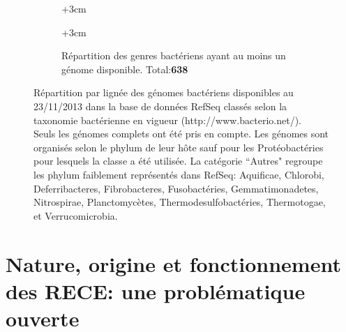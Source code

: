 \begin{figure}[H]
\begin{subfigure}{1\textwidth}
\begin{tikzpicture}
      	\end{tikzpicture}
     {\advance\leftskip+3cm}
    	\end{subfigure}
	\begin{subfigure}{1\textwidth}\label{fig2}
	\hspace{-3cm}
      {\advance\leftskip+3cm\caption{Répartition des genres bactériens ayant au moins un génome disponible. Total:\textbf{638}}}
      \end{subfigure}
      \hspace*{-3cm}
      \begin{minipage}{1.37\textwidth}
      \medskip
      \caption[Répartition par lignée des génomes bactériens disponibles]{\scriptsize Répartition par lignée des génomes bactériens disponibles au 23/11/2013 dans la base de données RefSeq \citep{pruitt2007ncbi} classés selon la taxonomie bactérienne en vigueur (http://www.bacterio.net/).\\
       Seuls les génomes complets ont été pris en compte. Les génomes sont organisés selon le phylum de leur hôte sauf pour les Protéobactéries pour lesquels la classe a été utilisée. La catégorie ``Autres" regroupe les phylum faiblement représentés dans RefSeq: Aquificae, Chlorobi, Deferribacteres, Fibrobacteres, Fusobactéries, Gemmatimonadetes, Nitrospirae, Planctomycètes, Thermodesulfobactéries, Thermotogae, et Verrucomicrobia.}\label{specieplot}
       \end{minipage}       
\end{figure}


\section{Nature, origine et fonctionnement des RECE: une problématique ouverte}\label{justification}    
	
